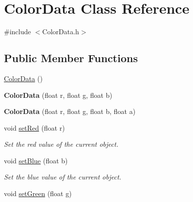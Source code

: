 \hypertarget{classColorData}{}\section{Color\+Data Class Reference}
\label{classColorData}


{\ttfamily \#include $<$Color\+Data.\+h$>$}

\subsection*{Public Member Functions}
\begin{DoxyCompactItemize}
\item 
\hyperlink{classColorData_accf4e0c0d4549051a46783e964c95164}{Color\+Data} ()
\item 
{\bfseries Color\+Data} (float r, float g, float b)\hypertarget{classColorData_a920b0332685ef72147fe19020fdac5d6}{}\label{classColorData_a920b0332685ef72147fe19020fdac5d6}

\item 
{\bfseries Color\+Data} (float r, float g, float b, float a)\hypertarget{classColorData_a0ecce2c6c597d9379ebb329883298dfd}{}\label{classColorData_a0ecce2c6c597d9379ebb329883298dfd}

\item 
void \hyperlink{classColorData_aa2e401956936f87a560b8f579514bf69}{set\+Red} (float r)\hypertarget{classColorData_aa2e401956936f87a560b8f579514bf69}{}\label{classColorData_aa2e401956936f87a560b8f579514bf69}

\begin{DoxyCompactList}\small\item\em Set the red value of the current object. \end{DoxyCompactList}\item 
void \hyperlink{classColorData_a01bbba90cac0bc1b3bd01d4aecc16477}{set\+Blue} (float b)\hypertarget{classColorData_a01bbba90cac0bc1b3bd01d4aecc16477}{}\label{classColorData_a01bbba90cac0bc1b3bd01d4aecc16477}

\begin{DoxyCompactList}\small\item\em Set the blue value of the current object. \end{DoxyCompactList}\item 
void \hyperlink{classColorData_a4a7833dfef4a33eee3857de09a72aee1}{set\+Green} (float g)\hypertarget{classColorData_a4a7833dfef4a33eee3857de09a72aee1}{}\label{classColorData_a4a7833dfef4a33eee3857de09a72aee1}


\end{DoxyCompactItemize}
